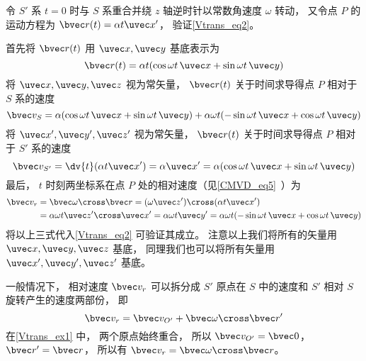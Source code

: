 \begin{example}{}\label{Vtrans_ex1}
令 $S'$ 系 $t = 0$ 时与 $S$ 系重合并绕 $z$ 轴逆时针以常数角速度 $\omega$ 转动， 又令点 $P$ 的运动方程为 $\bvec r(t) = \alpha t \uvec x'$， 验证\autoref{Vtrans_eq2}。

首先将 $\bvec r(t)$ 用 $\uvec x, \uvec y$ 基底表示为
\begin{equation}
\bvec r(t) = \alpha t (\cos\omega t\, \uvec x + \sin\omega t\, \uvec y)
\end{equation}
将 $\uvec x, \uvec y, \uvec z$ 视为常矢量， $\bvec r(t)$ 关于时间求导得点 $P$ 相对于 $S$ 系的速度
\begin{equation}
\bvec v_S = \alpha (\cos\omega t \,\uvec x + \sin\omega t \,\uvec y)
+ \alpha\omega t (-\sin\omega t \,\uvec x + \cos\omega t \,\uvec y)
\end{equation}
将 $\uvec x', \uvec y', \uvec z'$ 视为常矢量， $\bvec r(t)$ 关于时间求导得点 $P$ 相对于 $S'$ 系的速度
\begin{equation}
\bvec v_{S'} = \dv{t} (\alpha t \uvec x') = \alpha \uvec x' = \alpha (\cos\omega t\, \uvec x + \sin\omega t \,\uvec y)
\end{equation}
最后， $t$ 时刻两坐标系在点 $P$ 处的相对速度（见\autoref{CMVD_eq5}~）为
\begin{equation}\label{Vtrans_eq3}
\begin{aligned}
\bvec v_r &= \bvec\omega \cross \bvec r = (\omega \uvec z') \cross (\alpha t \uvec x') \\
&= \alpha\omega t \uvec z'\cross\uvec x' = \alpha\omega t \uvec y' = \alpha\omega t(-\sin \omega t \,\uvec x + \cos\omega t \,\uvec y)
\end{aligned}
\end{equation}
将以上三式代入\autoref{Vtrans_eq2} 可验证其成立。 注意以上我们将所有的矢量用 $\uvec x, \uvec y, \uvec z$ 基底， 同理我们也可以将所有矢量用 $\uvec x', \uvec y', \uvec z'$ 基底。
\end{example}

一般情况下， 相对速度 $\bvec v_r$ 可以拆分成 $S'$ 原点在 $S$ 中的速度和 $S'$ 相对 $S$ 旋转产生的速度两部份， 即
\begin{equation}\label{Vtrans_eq4}
\bvec v_r = \bvec v_{O'} + \bvec \omega \cross \bvec r'
\end{equation}
在\autoref{Vtrans_ex1} 中， 两个原点始终重合， 所以 $\bvec v_{O'} = \bvec 0$， $\bvec r' = \bvec r$， 所以有 $\bvec v_r = \bvec\omega \cross \bvec r$。

